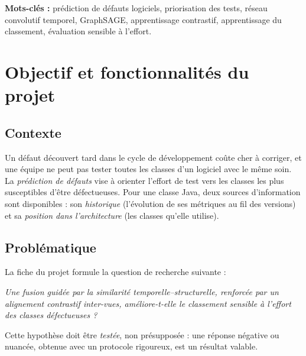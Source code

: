 \documentclass[11pt,a4paper,openany]{report}
\begin{document}
\medskip\noindent\textbf{Mots-clés :} prédiction de défauts logiciels, priorisation des tests, réseau convolutif
temporel, GraphSAGE, apprentissage contrastif, apprentissage du classement, évaluation sensible à l'effort.

{\hypersetup{linkcolor=black}\tableofcontents}
\listoffigures
{\let\clearpage\relax\let\cleardoublepage\relax\vspace{1cm}\listoftables}

\cleardoublepage
{}

\chapter{Objectif et fonctionnalités du projet}

\section{Contexte}
Un défaut découvert tard dans le cycle de développement coûte cher à corriger, et une équipe ne peut pas tester
toutes les classes d'un logiciel avec le même soin. La \emph{prédiction de défauts} vise à orienter l'effort de test
vers les classes les plus susceptibles d'être défectueuses. Pour une classe Java, deux sources d'information sont
disponibles : son \emph{historique} (l'évolution de ses métriques au fil des versions) et sa \emph{position dans
l'architecture} (les classes qu'elle utilise).

\section{Problématique}
La fiche du projet formule la question de recherche suivante :
\begin{keybox}
\itshape Une fusion guidée par la similarité temporelle--structurelle, renforcée par un alignement contrastif
inter-vues, améliore-t-elle le classement sensible à l'effort des classes défectueuses ?
\end{keybox}
Cette hypothèse doit être \emph{testée}, non présupposée : une réponse négative ou nuancée, obtenue avec un protocole
rigoureux, est un résultat valable.
\end{document}
